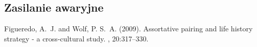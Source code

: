 \documentclass[12pt]{article} %
\begin{document}
\subsection{Zasilanie awaryjne}


\begin{thebibliography}{99} %

Figueredo, A.~J. and Wolf, P. S.~A. (2009).
\newblock Assortative pairing and life history strategy - a cross-cultural
  study.
, 20:317--330.
 
\end{thebibliography}

\end{document}
